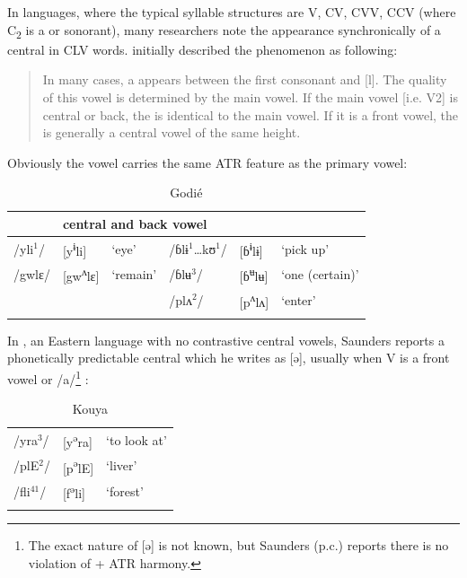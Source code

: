 \documentclass[output=paper
,newtxmath
,modfonts
,nonflat]{langsci/langscibook}
\begin{document}
In  languages, where the typical syllable structures are V, CV, CVV, CCV (where C\textsubscript{2} is a  or sonorant), many researchers note the appearance synchronically of a central  in CLV words.  \citet[98]{Marchese1979/1983} initially described the phenomenon as following:  
\begin{quote}
In many cases, a  appears between the first consonant and [l]. The quality of this vowel is determined by the main vowel.  If the main vowel [i.e. V2] is central or back, the  is identical to the main vowel.  If it is a front vowel, the  is generally a central vowel of the same height. 
\end{quote}

Obviously the vowel carries the same ATR feature as the primary vowel: 

\begin{table}
\label{ex:zogbo:20}
\caption{Godié}
\begin{tabular}{llllll}
\lsptoprule
\multicolumn{3}{l}{front vowel} & \multicolumn{3}{l}{central and back vowel}\\
\midrule
/yli$^1$/  & [y\textsuperscript{ɨ}li]  &  ‘eye’  &  /ɓlɨ$^1$…kʊ$^1$/ & [ɓ\textsuperscript{ɨ}lɨ] & ‘pick up’\\

/gwlɛ/ & [gw\textsuperscript{ʌ}lɛ] & ‘remain’ & /ɓlʉ$^3$/  &  [ɓ\textsuperscript{ʉ}lʉ]  & ‘one (certain)’\\

&&& /plʌ$^2$/  &  [p\textsuperscript{ʌ}lʌ]  & ‘enter’\\
\lspbottomrule
\end{tabular} 
\end{table}

In , an Eastern language with no contrastive central vowels, Saunders reports a phonetically predictable central  which he writes as [ə], {usually when V is a front vowel or /a/}\footnote{The exact nature of [ə] is not known, but Saunders (p.c.) reports there is no violation of + ATR harmony.} {:}

\begin{table}
\caption{Kouya \citep{Saunders2009}}
\label{tab:zogbo:21}
	\begin{tabular}{p{1.5cm}ll}
\lsptoprule
{/yra}{$^3$}{/} &   {[y}{\textsuperscript{ə}}{ra]} & {‘to look at’}\\

{/plE}{$^2$}{/}  &  {[p}{\textsuperscript{ə}}{lE]} & {‘liver’} \\

{/fli}{$^{41}$}{/}  &  {[f}{\textsuperscript{ə}}{li]} & {‘forest’} \\
\lspbottomrule
	\end{tabular}
\end{table}
\end{document}

